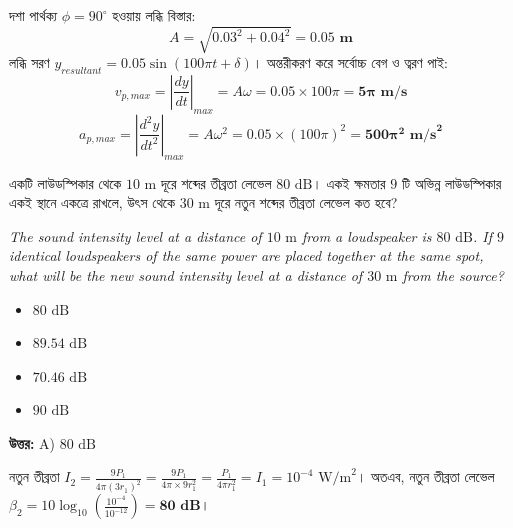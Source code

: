 \documentclass[12pt, a4paper]{article}
\begin{document}
\begin{tcolorbox}[solutionbox={সমাধান (Solution)}]
    \noindent
    দশা পার্থক্য $\phi = 90^\circ$ হওয়ায় লব্ধি বিস্তার:
    \[ A = \sqrt{0.03^2 + 0.04^2} = \mathbf{0.05\text{ m}} \]
    লব্ধি সরণ $y_{resultant} = 0.05 \sin(100\pi t + \delta)$। অন্তরীকরণ করে সর্বোচ্চ বেগ ও ত্বরণ পাই:
    \[ v_{p,max} = \left|\frac{dy}{dt}\right|_{max} = A\omega = 0.05 \times 100\pi = \mathbf{5\pi\text{ m/s}} \]
    \[ a_{p,max} = \left|\frac{d^2y}{dt^2}\right|_{max} = A\omega^2 = 0.05 \times (100\pi)^2 = \mathbf{500\pi^2\text{ m/s}^2} \]
\end{tcolorbox}
\begin{tcolorbox}[questionbox={প্রশ্ন (Question) 10}]
    \noindent
    একটি লাউডস্পিকার থেকে $10\text{ m}$ দূরে শব্দের তীব্রতা লেভেল $80\text{ dB}$। একই ক্ষমতার $9$ টি অভিন্ন লাউডস্পিকার একই স্থানে একত্রে রাখলে, উৎস থেকে $30\text{ m}$ দূরে নতুন শব্দের তীব্রতা লেভেল কত হবে?
    
    \vspace{0.8em}
    \begin{english}
    \noindent\textit{\color{darkgray}
    The sound intensity level at a distance of $10\text{ m}$ from a loudspeaker is $80\text{ dB}$. If $9$ identical loudspeakers of the same power are placed together at the same spot, what will be the new sound intensity level at a distance of $30\text{ m}$ from the source?
    }
    \end{english}
\end{tcolorbox}

\begin{itemize}[label={}, leftmargin=1cm, itemsep=0.5em]
    \item[\textbf{A)}] $80\text{ dB}$
    \item[\textbf{B)}] $89.54\text{ dB}$
    \item[\textbf{C)}] $70.46\text{ dB}$
    \item[\textbf{D)}] $90\text{ dB}$
\end{itemize}

\vspace{0.5em}
\begin{tcolorbox}[answerbox]
    \textbf{\color{success} উত্তর:} A) $80\text{ dB}$
\end{tcolorbox}
\vspace{1em}

\begin{tcolorbox}[solutionbox={সমাধান (Solution)}]
    \noindent
    নতুন তীব্রতা $I_2 = \frac{9 P_1}{4\pi (3r_1)^2} = \frac{9 P_1}{4\pi \times 9 r_1^2} = \frac{P_1}{4\pi r_1^2} = I_1 = 10^{-4}\text{ W/m}^2$। অতএব, নতুন তীব্রতা লেভেল $\beta_2 = 10 \log_{10} \left(\frac{10^{-4}}{10^{-12}}\right) = \mathbf{80\text{ dB}}$।
\end{tcolorbox}
\end{document}
